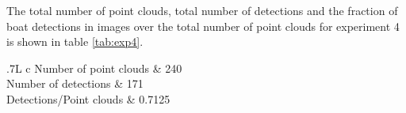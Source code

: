 The total number of point clouds, total number of detections and the fraction of boat detections in images over the total number of point clouds for experiment 4 is shown in table \ref{tab:exp4}.
\begin{table}[H]
	\centering
	\begin{tabularx}{.7\linewidth}{L c}
		\toprule
		Number of point clouds & 240\\
		\midrule
		Number of detections & 171\\
		\midrule
		Detections/Point clouds & 0.7125 \\
		\bottomrule
	\end{tabularx}
	\caption{Data from experiment 4.}
	\label{tab:exp4}
\end{table}
